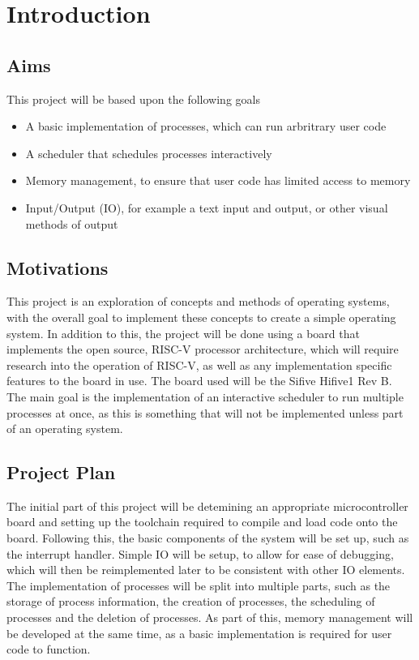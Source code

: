 \chapter{Introduction}
\label{cha:intro}
\section{Aims}
This project will be based upon the following goals
\begin{itemize}
    \item A basic implementation of processes, which can run arbritrary user code
    \item A scheduler that schedules processes interactively
    \item Memory management, to ensure that user code has limited access to memory
    \item Input/Output (IO), for example a text input and output, or other visual methods of output
\end{itemize}
\section{Motivations}
This project is an exploration of concepts and methods of operating systems, with the overall goal to implement these concepts to create a simple operating system. 
In addition to this, the project will be done using a board that implements the open source, RISC-V processor architecture, which will require research into the operation of RISC-V, as well as any implementation specific features to the board in use. The board used will be the Sifive Hifive1 Rev B.
The main goal is the implementation of an interactive scheduler to run multiple processes at once, as this is something that will not be implemented unless part of an operating system.

\section{Project Plan}
The initial part of this project will be detemining an appropriate microcontroller board and setting up the toolchain required to compile and load code onto the board. Following this, the basic components of the system will be set up, such as the interrupt handler. Simple IO will be setup, to allow for ease of debugging, which will then be reimplemented later to be consistent with other IO elements. The implementation of processes will be split into multiple parts, such as the storage of process information, the creation of processes, the scheduling of processes and the deletion of processes. As part of this, memory management will be developed at the same time, as a basic implementation is required for user code to function.

